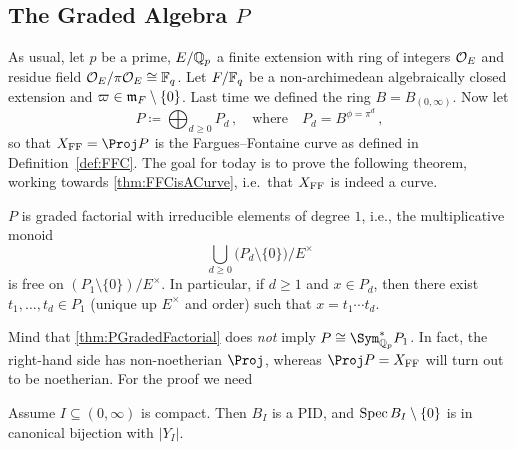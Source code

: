 \documentclass[a4paper, 10pt, oneside, DIV=9, chapterprefix=true, numbers=enddot,bibliography=totoc]{scrbook}
\begin{document}
\subsection{The Graded Algebra \texorpdfstring{$P$}{P}}
As usual, let $p$ be a prime, $E/\mathbb{Q}_p$ a finite extension with ring of integers $\mathcal{O}_E$ and residue field $\mathcal{O}_E/\pi\mathcal{O}_E\cong \mathbb{F}_q$. Let $F/\mathbb{F}_q$ be a non-archimedean algebraically closed extension and $\varpi\in\mathfrak{m}_F\setminus\{0\}$.
Last time we defined the ring $B=B_{(0,\infty)}$. Now let
\begin{equation*}
	P\coloneqq \bigoplus_{d\geq 0}P_d\,,\quad\text{where}\quad P_d=B^{\phi=\pi^d}\,,
\end{equation*}
so that $X_\FFC=\Proj P$ is the Fargues--Fontaine curve as defined in Definition~\cref{def:FFC}. The goal for today is to prove the following theorem, working towards \cref{thm:FFCisACurve}, i.e.\ that $X_{\mathrm{FF}}$ is indeed a curve.
\begin{thm}\label{thm:PGradedFactorial}
	$P$ is graded factorial with irreducible elements of degree $1$, i.e., the multiplicative monoid
	\begin{equation*}
		\bigcup_{d\geq 0}\big(P_d\setminus\{0\}\big)/E^\times
	\end{equation*}
	is free on $(P_1\setminus\{0\})/E^\times$. In particular, if $d\geq 1$ and $x\in P_d$, then there exist $t_1,\dotsc,t_d\in P_1$ (unique up $E^\times$ and order) such that $x=t_1\dotsm t_d$.
\end{thm}
Mind that \cref{thm:PGradedFactorial} does \emph{not} imply $P\cong \Sym_{\IQ_p}^*P_1$. In fact, the right-hand side has non-noetherian $\Proj$, whereas $\Proj P=X_\FFC$ will turn out to be noetherian. For the proof we need
\begin{thm}\label{thm:BIPID}
	Assume $I\subseteq (0,\infty)$ is compact. Then $B_I$ is a PID, and $\operatorname{Spec} B_I\setminus\{0\}$ is in canonical bijection with $|Y_I|$.
\end{thm}
\end{document}

